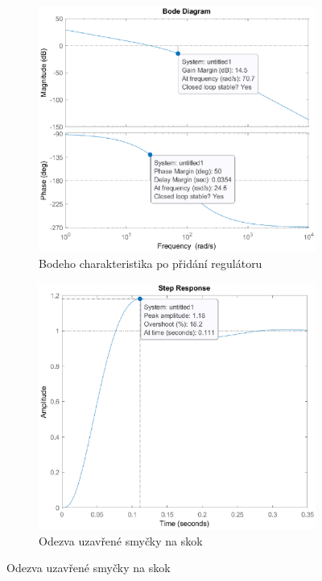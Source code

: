 \documentclass[twoside]{article}
\begin{document}
\begin{figure}[htbp]
    \centering %
\begin{subfigure}{0.48\textwidth}
  \includegraphics[width=\linewidth]{bode_novy.eps}
  \caption{Bodeho charakteristika po přidání regulátoru}
  \label{fig:bode_regulator}
\end{subfigure}\hfil %
\begin{subfigure}{0.48\textwidth}
	\includegraphics[width=\linewidth]{step_response.eps}
	\caption{Odezva uzavřené smyčky na skok}
	\label{fig:step_response}
\end{subfigure}
\end{figure}
\end{document}
